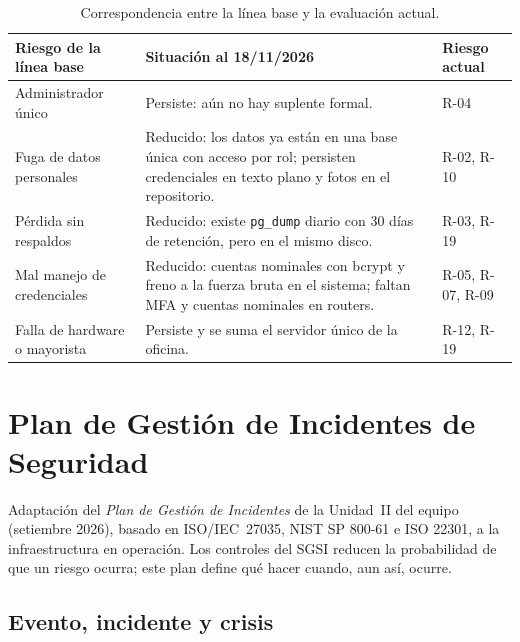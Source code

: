 \begin{table}[H]
\centering
\caption{Correspondencia entre la línea base y la evaluación actual.}
\label{tab:anx-lineabase-cambios}
\small
\begin{tabularx}{\textwidth}{L{3.6cm}XL{1.6cm}}
\toprule
\textbf{Riesgo de la línea base} & \textbf{Situación al 18/11/2026} & \textbf{Riesgo actual} \\
\midrule
Administrador único & Persiste: aún no hay suplente formal. & R-04 \\
Fuga de datos personales & Reducido: los datos ya están en una base única con acceso por rol; persisten credenciales en texto plano y fotos en el repositorio. & R-02, R-10 \\
Pérdida sin respaldos & Reducido: existe \texttt{pg\_dump} diario con 30 días de retención, pero en el mismo disco. & R-03, R-19 \\
Mal manejo de credenciales & Reducido: cuentas nominales con bcrypt y freno a la fuerza bruta en el sistema; faltan MFA y cuentas nominales en routers. & R-05, R-07, R-09 \\
Falla de hardware o mayorista & Persiste y se suma el servidor único de la oficina. & R-12, R-19 \\
\bottomrule
\end{tabularx}
\end{table}

\chapter{Plan de Gestión de Incidentes de Seguridad}
\label{anx:sgsi-incidentes}

Adaptación del \emph{Plan de Gestión de Incidentes} de la Unidad~II del equipo (setiembre
2026), basado en ISO/IEC~27035, NIST SP 800-61 e ISO 22301, a la infraestructura en
operación. Los controles del SGSI reducen la probabilidad de que un riesgo ocurra; este plan
define qué hacer cuando, aun así, ocurre.

\section{Evento, incidente y crisis}

